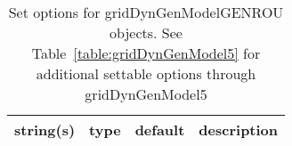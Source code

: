 \begin{table}[ht]
\centering
\begin{tabular}{p{5cm} c c p{7cm}}
\hline
string(s) & type & default & description \\
\hline
\hline
\end{tabular}
\caption{Set options for gridDynGenModelGENROU objects. See Table~\ref{table:gridDynGenModel5} for additional settable options through gridDynGenModel5}
\label{table:gridDynGenModelGENROU}
\end{table}

